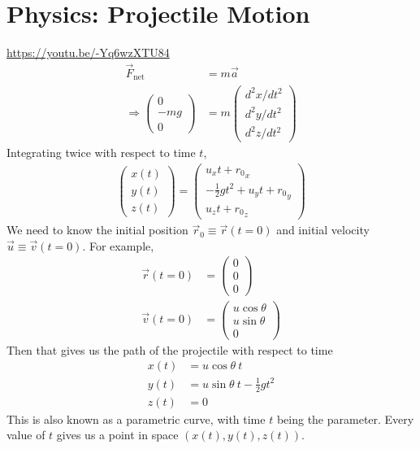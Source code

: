 \documentclass{article}
\begin{document}
\section{Physics: Projectile Motion}
\url{https://youtu.be/-Yq6wzXTU84}
\begin{align}
\vec{F}_{\text{net}} &= m \vec{a} \\
\Rightarrow \left(
    \begin{array}{c}  
         0 \\
         -mg \\
         0
    \end{array} 
    \right) &= m \left(
    \begin{array}{c}  
         d^2x/dt^2 \\
         d^2y/dt^2 \\
         d^2z/dt^2
    \end{array} 
    \right)
\end{align}
Integrating twice with respect to time $t$,
\begin{align}
    \left(
    \begin{array}{c}  
         x(t) \\
         y(t) \\
         z(t)
    \end{array} 
    \right) = \left(
    \begin{array}{c}  
          {u}_x t + {r_0}_x\\
         -\frac{1}{2}gt^2 + {u}_y t + {r_0}_y\\
          {u}_z t + {r_0}_z
    \end{array} 
    \right)
\end{align}
We need to know the initial position $\vec{r}_0 \equiv \vec{r}(t=0)$ and initial velocity $\vec{u} \equiv \vec{v}(t=0)$. For example, 
\begin{align}
    \vec{r}(t=0) &= \left(
    \begin{array}{c}  
         0 \\
         0 \\
         0
    \end{array} 
    \right) \\
    \vec{v}(t=0) &= \left(
    \begin{array}{c}  
         u \cos \theta \\
         u \sin \theta \\
         0
    \end{array} 
    \right)
\end{align}   
Then that gives us the path of the projectile with respect to time
\begin{align}
    x(t) &= u \cos \theta\ t \label{eq:xt} \\
    y(t) &= u \sin \theta\ t - \frac{1}{2} gt^2 \\
    z(t) &= 0
\end{align}
This is also known as a parametric curve, with time $t$ being the parameter. Every value of $t$ gives us a point in space $(x(t),y(t),z(t))$. 
\end{document}

